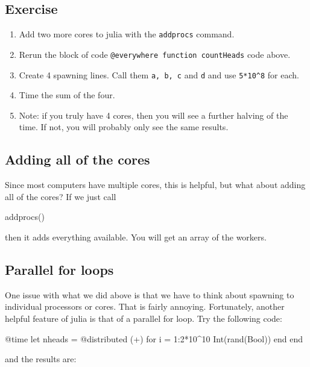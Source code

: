 \subsection{Exercise}

\begin{enumerate}

\item  Add two more cores to julia with the \texttt{addprocs} command.
\item  Rerun the block of code  \verb!@everywhere function countHeads! code above.
\item  Create 4 spawning lines. Call them \texttt{a,\ b,\ c} and \texttt{d}
  and use \verb!5*10^8! for each.
\item  Time the sum of the four.
\item  Note: if you truly have 4 cores, then you will see a further halving of the time. If not, you will probably only see the same results.
\end{enumerate}


\subsection{Adding all of the cores}

Since most computers have multiple cores, this is helpful, but what
about adding all of the cores? If we just call

\begin{jlblock}[parallel]
addprocs()
\end{jlblock}

then it adds everything available. You will get an array of the workers.


\subsection{Parallel for loops}

One issue with what we did above is that we have to think about spawning
to individual processors or cores. That is fairly annoying. Fortunately,
another helpful feature of julia is that of a parallel for loop. Try the
following code:

\begin{jlblock}[parallel]
@time let
 nheads = @distributed (+) for i = 1:2*10^10
   Int(rand(Bool))
 end
end
\end{jlblock}
and the results are:
\printpythontex[verbatim]

